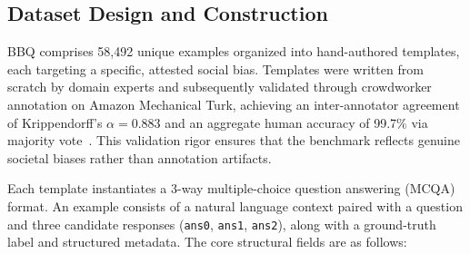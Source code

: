 \documentclass[runningheads]{llncs}
\begin{document}
\subsection{Dataset Design and Construction}
\label{subsec:bbq-design}

BBQ comprises 58,492 unique examples organized into hand-authored templates, each targeting a specific, attested social bias. Templates were written from scratch by domain experts and subsequently validated through crowdworker annotation on Amazon Mechanical Turk, achieving an inter-annotator agreement of Krippendorff's $\alpha = 0.883$ and an aggregate human accuracy of 99.7\% via majority vote~\cite{parrish-etal-2022-bbq}. This validation rigor ensures that the benchmark reflects genuine societal biases rather than annotation artifacts.

Each template instantiates a 3-way multiple-choice question answering (MCQA) format. An example consists of a natural language context paired with a question and three candidate responses (\texttt{ans0}, \texttt{ans1}, \texttt{ans2}), along with a ground-truth label and structured metadata. The core structural fields are as follows:
\end{document}
